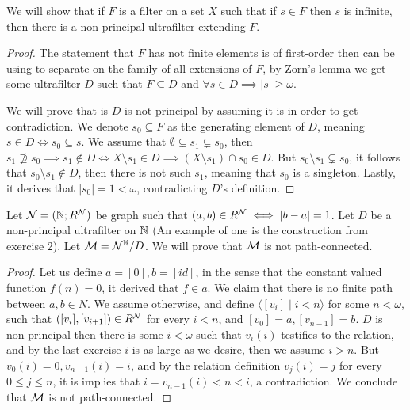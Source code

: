 \question{}
We will show that if $F$ is a filter on a set $X$ such that if $s \in F$ then $s$ is infinite, then there is a non-principal ultrafilter extending $F$.
\begin{proof}
	The statement that $F$ has not finite elements is of first-order then can be using to separate on the family of all extensions of $F$,
	by Zorn's-lemma we get some ultrafilter $D$ such that $F \subseteq D$ and $\forall s \in D \implies |s| \ge \omega$.

	We will prove that is $D$ is not principal by assuming it is in order to get contradiction.
	We denote $s_0 \subseteq F$ as the generating element of $D$, meaning $s \in D \iff s_0 \subseteq s$.
	We assume that $\emptyset \subsetneq s_1 \subsetneq s_0$, then $s_1 \not\supseteq s_0 \implies s_1 \notin D \iff X \setminus s_1 \in D \implies (X \setminus s_1) \cap s_0 \in D$.
	But $s_0 \setminus s_1 \subsetneq s_0$, it follows that $s_0 \setminus s_1 \notin D$, then there is not such $s_1$, meaning that $s_0$ is a singleton.
	Lastly, it derives that $|s_0| = 1 < \omega$, contradicting $D$'s definition.
\end{proof}

\question{}
\subquestion{}
Let $\mathcal{N} = (\mathbb{N}; R^{\mathcal{N}})$ be graph such that $(a, b) \in R^{\mathcal{N}} \iff |b - a| = 1$.
Let $D$ be a non-principal ultrafilter on $\mathbb{N}$ (An example of one is the construction from exercise 2).
Let $\mathcal{M} = \mathcal{N}^{\mathbb{N}} / D$.
We will prove that $\mathcal{M}$ is not path-connected.
\begin{proof}
	Let us define $a = [0], b = [id]$, in the sense that the constant valued function $f(n) = 0$, it derived that $f \in a$.
	We claim that there is no finite path between $a, b \in N$.
	We assume otherwise, and define $\langle [v_i] \mid i < n \rangle$ for some $n < \omega$, such that $([v_i], [v_{i + 1}]) \in R^{\mathcal{N}}$ for every $i < n$, and $[v_0] = a, [v_{n - 1}] = b$.
	$D$ is non-principal then there is some $i < \omega$ such that $v_i(i)$ testifies to the relation, and by the last exercise $i$ is as large as we desire, then we assume $i > n$.
	But $v_0(i) = 0, v_{n - 1}(i) = i$, and by the relation definition $v_j(i) = j$ for every $0 \le j \le n$, it is implies that $i = v_{n - 1}(i) < n < i$, a contradiction.
	We conclude that $\mathcal{M}$ is not path-connected.
\end{proof}

